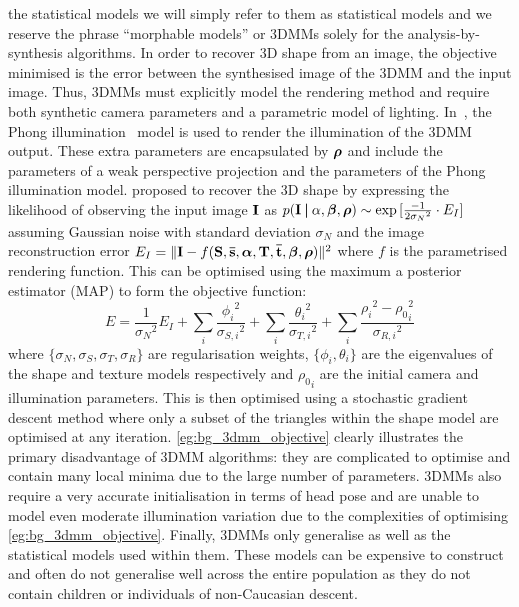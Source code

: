 the statistical models we will simply refer to them as statistical models and
we reserve the phrase ``morphable models'' or 3DMMs solely for the
analysis-by-synthesis algorithms. In order to recover 3D shape from an image,
the objective minimised is the error between the synthesised image of the
3DMM and the input image. Thus, 3DMMs must explicitly model the rendering
method and require both synthetic camera parameters and a parametric model
of lighting. In~\cite{volker1999morphable},
the Phong illumination~\cite{tuong1973illumination} model is used to render
the illumination of the 3DMM output. These extra parameters are encapsulated
by $\boldsymbol{\mathbf{\rho}}$ and include the parameters of a weak perspective projection
and the parameters of the Phong illumination model.
\citet{volker1999morphable} proposed to recover the 3D shape by expressing
the likelihood of observing the input image $\boldsymbol{\mathbf{I}}$ as
$p(\boldsymbol{\mathbf{I}} \:\boldsymbol{\mathbf{\vert}}\:{\alpha},\boldsymbol{\mathbf{\beta}},\boldsymbol{\mathbf{\rho}}) \sim \exp{[\frac{-1}{2{\sigma_N}^2} \cdot E_I]}$
assuming Gaussian noise with standard deviation $\sigma_N$ and the image
reconstruction error $E_I = \lVert \boldsymbol{\mathbf{I}} - f(\boldsymbol{\mathbf{S}}, \boldsymbol{\mathbf{\bar{s}}}, \boldsymbol{\mathbf{\alpha}}, \boldsymbol{\mathbf{T}}, \boldsymbol{\mathbf{\bar{t}}}, \boldsymbol{\mathbf{\beta}}, \boldsymbol{\mathbf{\rho}}) \rVert^2$ where $f$ is the parametrised rendering function. This
can be optimised using the maximum a posterior estimator (MAP) to form
the objective function:
\begin{equation}\label{eg:bg_3dmm_objective}
	E = \frac{1}{{\sigma_N}^2} E_I + \sum_i \frac{{\phi_i}^2}{{\sigma_{S,i}}^2} + \sum_i \frac{{\theta_i}^2}{{\sigma_{T,i}}^2} + \sum_i \frac{{\rho_i}^2 - {\rho_0}_i^2}{{\sigma_{R,i}}^2}
\end{equation}
where $\{\sigma_N,\sigma_S,\sigma_T,\sigma_R\}$ are regularisation weights,
$\{\phi_i, \theta_i \}$ are the eigenvalues of the shape and texture models
respectively and ${\rho_0}_i$ are the initial camera and illumination parameters.
This is then optimised using a stochastic gradient descent method where
only a subset of the triangles within the shape model are optimised at any
iteration. \cref{eg:bg_3dmm_objective} clearly illustrates the primary
disadvantage of 3DMM algorithms: they are complicated to optimise and contain
many local minima due to the large number of parameters. 3DMMs also require
a very accurate initialisation in terms of head pose and are unable to model
even moderate illumination variation due to the complexities of optimising
\cref{eg:bg_3dmm_objective}. Finally, 3DMMs only generalise as well as the
statistical models used within them. These models can be expensive to
construct and often do not generalise well across the entire population as
they do not contain children or individuals of non-Caucasian descent.

